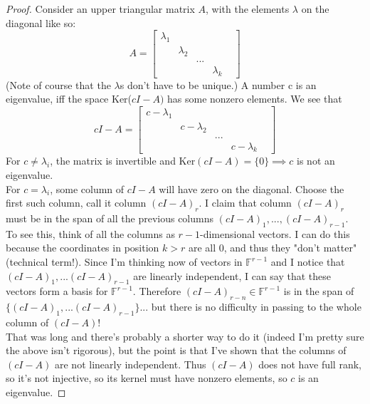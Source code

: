 \documentclass[12pt]{article}
\newenvironment{problem}[2][Problem]{\begin{trivlist}
\item[\hskip \labelsep {\bfseries #1}\hskip \labelsep {\bfseries #2.}]}{\end{trivlist}}
\theoremstyle{definition}
\theoremstyle{definition}
\theoremstyle{definition}
\theoremstyle{definition}
\begin{document}
\begin{problem}{4.6}
\begin{proof}
Consider an upper triangular matrix $A$, with the elements $\lambda$ on the diagonal like so:
$$
A = \begin{bmatrix}
\lambda_1 & & \\
& \lambda_2 & \\
& & ... & & \\
& & & \lambda_k
\end{bmatrix}
$$
(Note of course that the $\lambda$s don't have to be unique.) A number c is an eigenvalue, iff the space Ker($cI - A)$ has some nonzero elements. We see that 
$$
cI - A = \begin{bmatrix}
c - \lambda_1 & & \\
& c - \lambda_2 & \\
& & ... & & \\
& & & c - \lambda_k
\end{bmatrix}
$$
For $c \neq \lambda_i$, the matrix is invertible and Ker$(cI - A) = \{0\} \implies c$ is not an eigenvalue. \\
For $c = \lambda_i$, some column of $cI -A$ will have zero on the diagonal. Choose the first such column, call it column $(cI-A)_r$. I claim that column $(cI-A)_r$ must be in the span of all the previous columns $(cI-A)_1,...,(cI-A)_{r-1}$.  \\
To see this, think of all the columns as $r-1$-dimensional vectors. I can do this because the coordinates in position $k>r$ are all 0, and thus they "don't matter" (technical term!). Since I'm thinking now of vectors in $\mathbb{F}^{r-1}$ and I notice that $(cI-A)_1, ... (cI-A)_{r-1}$ are linearly independent, I can say that these vectors form a basis for  $\mathbb{F}^{r-1}$. Therefore $(cI-A)_{r-n} \in \mathbb{F}^{r-1}$ is in the span of $ \{ (cI-A)_1, ... (cI-A)_{r-1} \}$... but there is no difficulty in passing to the whole column of $(cI-A)$! \\
That was long and there's probably a shorter way to do it (indeed I'm pretty sure the above isn't rigorous), but the point is that I've shown that the columns of $(cI-A)$ are not linearly independent. Thus $(cI-A)$ does not have full rank, so it's not injective, so its kernel must have nonzero elements, so $c$ is an eigenvalue.
\end{proof}
\end{problem}
\end{document}
